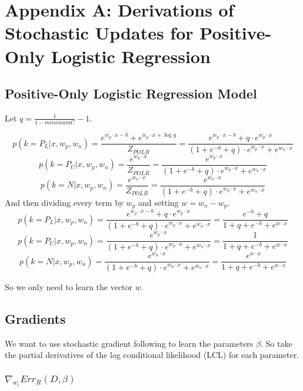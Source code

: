 \documentclass{article}
\begin{document}



\onecolumn

\section{Appendix A: Derivations of Stochastic Updates for Positive-Only Logistic Regression}

\subsection{Positive-Only Logistic Regression Model}

Let $q = \frac{1}{1 - minimumC} - 1$.

$$
p(k=P_L | x, w_p, w_n) =  \frac{e^{w_p \cdot x - b} + e^{w_p \cdot x + \log{q}}}{Z_{POLR}} 
				     = \frac{e^{w_p \cdot x - b} + q \cdot e^{w_p \cdot x}}{(1 + e^{-b} + q) \cdot e^{w_p \cdot x} + e^{w_n \cdot x}} 
$$
$$
p(k=P_U | x, w_p, w_n) =  \frac{e^{w_p \cdot x}}{Z_{POLR}} 
				     = \frac{e^{w_p \cdot x}}{(1 + e^{-b} + q) \cdot e^{w_p \cdot x} + e^{w_n \cdot x}} 
$$
$$
p(k=N | x, w_p, w_n) =  \frac{e^{w_n \cdot x}}{Z_{POLR}} 
				 = \frac{e^{w_n \cdot x}}{(1 + e^{-b} + q) \cdot e^{w_p \cdot x} + e^{w_n \cdot x}} 
$$
And then dividing every term by $w_p$ and setting $w = w_n - w_p$.
$$
p(k=P_L | x, w_p, w_n) = \frac{e^{w_p \cdot x - b} + q \cdot e^{w_p \cdot x}}{(1 + e^{-b} + q) \cdot e^{w_p \cdot x} + e^{w_n \cdot x}} 
 				     = \frac{e^{-b} + q}{1 + q + e^{-b} + e^{w \cdot x}}
$$
$$
p(k=P_U | x, w_p, w_n) = \frac{e^{w_p \cdot x}}{(1 + e^{-b} + q) \cdot e^{w_p \cdot x} + e^{w_n \cdot x}} 
				     = \frac{1}{1 + q + e^{-b} + e^{w \cdot x}}
$$
$$
p(k=N | x, w_p, w_n) = \frac{e^{w_n \cdot x}}{(1 + e^{-b} + q) \cdot e^{w_p \cdot x} + e^{w_n \cdot x}} 
				= \frac{e^{w \cdot x}}{1 + q + e^{-b} + e^{w \cdot x}}
$$


So we only need to learn the vector $w$.

\subsection{Gradients}

We want to use stochastic gradient following to learn the parameters $\beta$. So take the partial derivatives of the log conditional likelihood (LCL) for each parameter.

\subsubsection{$ \nabla_{w_i}{Err_R (D, \beta)}$}
\end{document}
